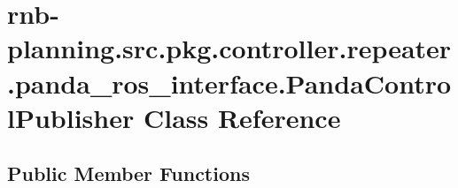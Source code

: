\hypertarget{classrnb-planning_1_1src_1_1pkg_1_1controller_1_1repeater_1_1panda__ros__interface_1_1_panda_control_publisher}{}\section{rnb-\/planning.src.\+pkg.\+controller.\+repeater.\+panda\+\_\+ros\+\_\+interface.\+Panda\+Control\+Publisher Class Reference}
\label{classrnb-planning_1_1src_1_1pkg_1_1controller_1_1repeater_1_1panda__ros__interface_1_1_panda_control_publisher}
\subsection*{Public Member Functions}
